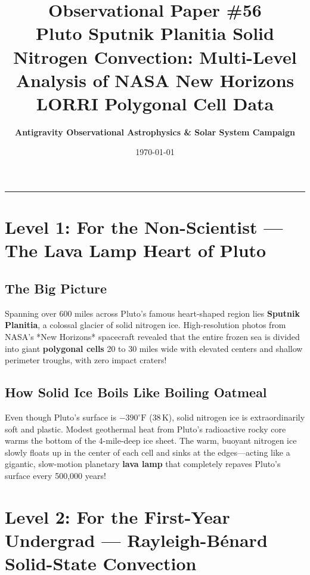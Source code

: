 \documentclass[11pt,a4paper]{article}
\title{\Huge \textbf{Observational Paper \#56}\\ \Large Pluto Sputnik Planitia Solid Nitrogen Convection: Multi-Level Analysis of NASA New Horizons LORRI Polygonal Cell Data}
\author{\textbf{Antigravity Observational Astrophysics \& Solar System Campaign}}
\date{\today}
\begin{document}
\maketitle

\vspace{-1em}
\begin{center}
\rule{\textwidth}{1.5pt}
\end{center}

\section*{Level 1: For the Non-Scientist — The Lava Lamp Heart of Pluto}

\subsection*{The Big Picture}
Spanning over 600 miles across Pluto's famous heart-shaped region lies \textbf{Sputnik Planitia}, a colossal glacier of solid nitrogen ice. High-resolution photos from NASA's *New Horizons* spacecraft revealed that the entire frozen sea is divided into giant \textbf{polygonal cells} 20 to 30 miles wide with elevated centers and shallow perimeter troughs, with zero impact craters!

\subsection*{How Solid Ice Boils Like Boiling Oatmeal}
Even though Pluto's surface is $-390^\circ\text{F}$ ($38\,\text{K}$), solid nitrogen ice is extraordinarily soft and plastic. Modest geothermal heat from Pluto's radioactive rocky core warms the bottom of the 4-mile-deep ice sheet. The warm, buoyant nitrogen ice slowly floats up in the center of each cell and sinks at the edges—acting like a gigantic, slow-motion planetary \textbf{lava lamp} that completely repaves Pluto's surface every 500,000 years!

\newpage

\section*{Level 2: For the First-Year Undergrad — Rayleigh-B\'enard Solid-State Convection}
\end{document}
